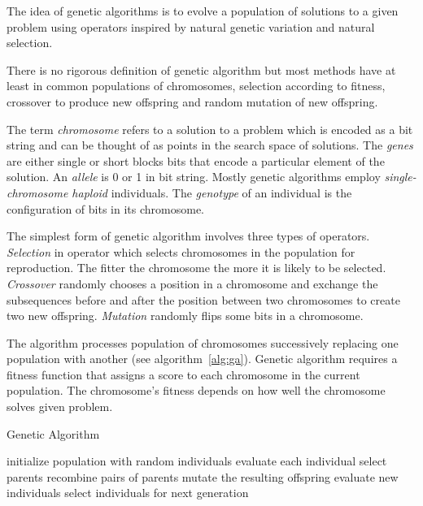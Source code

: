 \documentclass{article}
\begin{document}
The idea of genetic algorithms is to evolve a population of solutions
to a given problem using operators inspired by natural genetic variation
and natural selection.
\cite{mitchell1996}

There is no rigorous definition of genetic algorithm but most methods
have at least in common populations of chromosomes,
selection according to fitness, crossover to produce new offspring
and random mutation of new offspring.
\cite{mitchell1996}

The term \textit{chromosome} refers to a solution to a problem
which is encoded as a bit string
and can be thought of as points in the search space of solutions.
The \textit{genes} are either single or short blocks bits
that encode a particular element of the solution.
An \textit{allele} is 0 or 1 in bit string.
Mostly genetic algorithms employ \textit{single-chromosome haploid} individuals.
The \textit{genotype} of an individual is the configuration of bits
in its chromosome.
\cite{mitchell1996}

The simplest form of genetic algorithm involves three types of operators.
\textit{Selection} in operator which selects chromosomes in the population for
reproduction.
The fitter the chromosome the more it is likely to be selected.
\textit{Crossover} randomly chooses a position in a chromosome
and exchange the subsequences before and after the position between
two chromosomes to create two new offspring.
\textit{Mutation} randomly flips some bits in a chromosome.
\cite{mitchell1996}

The algorithm processes population of chromosomes successively replacing
one population with another (see algorithm~\ref{alg:ga}).
Genetic algorithm requires a fitness function that assigns a score to
each chromosome in the current population.
The chromosome's fitness depends on how well the chromosome solves given
problem.
\cite{mitchell1996}

\begin{algorithm}[hb]
\caption{Genetic Algorithm~\cite{eiben2003}}
\label{alg:ga}
\begin{algorithmic}
\STATE initialize population with random individuals
\STATE evaluate each individual
\STATE select parents
\STATE recombine pairs of parents
\STATE mutate the resulting offspring
\STATE evaluate new individuals
\STATE select individuals for next generation
\ENDWHILE
\end{algorithmic}
\end{algorithm}
\end{document}
